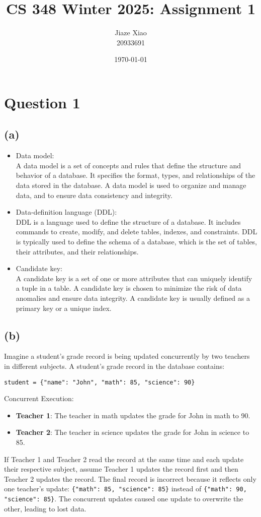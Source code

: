 \documentclass{article}
\title{\textbf{CS 348 Winter 2025: Assignment 1}}
\author{Jiaze Xiao \\ 20933691}
\date{\today}
\begin{document}
\maketitle

\section*{Question 1}
\subsection*{(a)}
\begin{itemize}
    \item Data model:\\
          A data model is a set of concepts and rules that define the structure and behavior of a database. It specifies the format, types, and relationships of the data stored in the database. A data model is used to organize and manage data, and to ensure data consistency and integrity.
    \item Data-definition language (DDL):\\
          DDL is a language used to define the structure of a database. It includes commands to create, modify, and delete tables, indexes, and constraints. DDL is typically used to define the schema of a database, which is the set of tables, their attributes, and their relationships.
    \item Candidate key:\\
          A candidate key is a set of one or more attributes that can uniquely identify a tuple in a table. A candidate key is chosen to minimize the risk of data anomalies and ensure data integrity. A candidate key is usually defined as a primary key or a unique index.
\end{itemize}

\subsection*{(b)}
Imagine a student's grade record is being updated concurrently by two teachers in different subjects.
A student's grade record in the database contains:
\begin{center}
    \texttt{student = \{"name": "John", "math": 85, "science": 90\}}
\end{center}
Concurrent Execution:
\begin{itemize}
    \item \textbf{Teacher 1}: The teacher in math updates the grade for John in math to 90.
    \item \textbf{Teacher 2}: The teacher in science updates the grade for John in science to 85.
\end{itemize}
If Teacher 1 and Teacher 2 read the record at the same time and each update their respective subject, assume Teacher 1 updates the record first and then Teacher 2 updates the record. The final record is incorrect because it reflects only one teacher's update: \texttt{\{"math": 85, "science": 85\}} instead of \texttt{\{"math": 90, "science": 85\}}. The concurrent updates caused one update to overwrite the other, leading to lost data.
\end{document}

